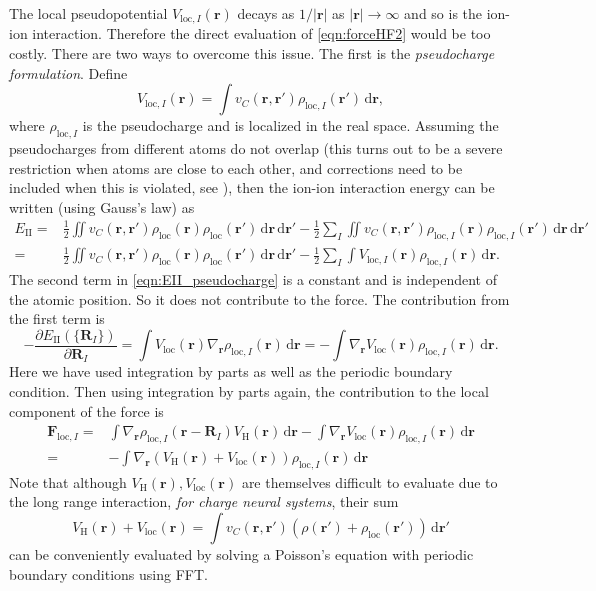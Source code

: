 \documentclass{article}
\newcommand{\bvec}[1]{\mathbf{#1}}
\newcommand{\vr}{\bvec{r}}
\newcommand{\vF}{\bvec{F}}
\newcommand{\vR}{\bvec{R}}
\newcommand{\ud}{\,\mathrm{d}}
\newcommand{\II}{\mathrm{II}}
\theoremstyle{plain}
\theoremstyle{remark}
\theoremstyle{plain}
\theoremstyle{plain}
\theoremstyle{plain}
\begin{document}
The local pseudopotential $V_{\text{loc},I}(\vr)$ decays as $1/|\vr|$ as $|\vr|\to \infty$ and so is the ion-ion interaction. Therefore the direct evaluation of \cref{eqn:forceHF2} would be too costly. There are two ways to overcome this issue. The first is the \textit{pseudocharge formulation}. Define
\begin{equation}
V_{\text{loc},I}(\vr)=\int v_C(\vr,\vr') \rho_{\text{loc},I}(\vr')\ud \vr,
\label{eqn:pseudocharge}
\end{equation}
where $\rho_{\text{loc},I}$ is the pseudocharge and is localized in the real space. Assuming the pseudocharges from different atoms do not overlap (this turns out to be a severe restriction when atoms are close to each other, and corrections need to be included when this is violated, see \cite{PaskSterne2005,SolerArtachoGaleEtAl2002}), then the ion-ion interaction energy can be written (using Gauss's law) as 
\begin{equation}
\begin{aligned}
E_{\II}=&\frac12 \iint v_C(\vr,\vr') \rho_{\text{loc}}(\vr)\rho_{\text{loc}}(\vr') \ud \vr \ud \vr' -\frac12  \sum_{I} \iint v_C(\vr,\vr') \rho_{\text{loc},I}(\vr)\rho_{\text{loc},I}(\vr') \ud \vr \ud \vr'\\
=&\frac12  \iint v_C(\vr,\vr') \rho_{\text{loc}}(\vr)\rho_{\text{loc}}(\vr') \ud \vr \ud \vr' - \frac12 \sum_{I} \int V_{\text{loc},I}(\vr) \rho_{\text{loc},I}(\vr) \ud \vr.
\end{aligned}
\label{eqn:EII_pseudocharge}
\end{equation}
The second term in \cref{eqn:EII_pseudocharge} is a constant and is independent of the atomic position. So it does not contribute to the force. The contribution from the first term is
\[
 -\frac{\partial E_{\II}(\{\vR_{I}\})}{\partial
  \vR_{I}}=\int V_{\text{loc}}(\vr) \nabla_\vr \rho_{\text{loc},I}(\vr) \ud \vr=-\int  \nabla_\vr V_{\text{loc}}(\vr) \rho_{\text{loc},I}(\vr) \ud \vr.
\]
Here we have used integration by parts as well as the periodic boundary condition. Then using integration by parts again, the contribution to the local component of the force is
\begin{equation}
\begin{aligned}
\vF_{\text{loc},I}=&\int \nabla_{\vr} \rho_{\text{loc},I}(\vr-\vR_{I})
    V_{\text{H}}(\vr) \ud \vr-\int  \nabla_\vr V_{\text{loc}}(\vr) \rho_{\text{loc},I}(\vr) \ud \vr\\
=&-
    \int  \nabla_\vr (V_{\text{H}}(\vr)+V_{\text{loc}}(\vr)) \rho_{\text{loc},I}(\vr) \ud \vr
\end{aligned}
\label{eqn:force_loc2}
\end{equation}
Note that although $V_{\text{H}}(\vr),V_{\text{loc}}(\vr)$ are themselves difficult to evaluate due to the long range interaction, \textit{for charge neural systems},  their sum
\[
V_{\text{H}}(\vr)+V_{\text{loc}}(\vr)=\int v_C(\vr,\vr') (\rho(\vr')+\rho_{\text{loc}}(\vr'))\ud \vr'
\]
can be conveniently evaluated by solving a Poisson's equation with periodic boundary conditions using FFT. 
\end{document}
